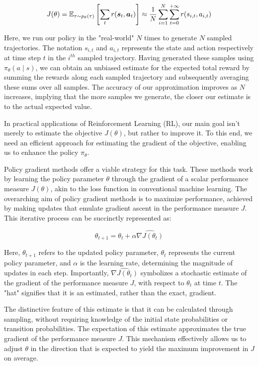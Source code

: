 \begin{align}
    J(\theta) = \mathbb E_{\tau \sim p_{\theta}(\tau)} \left[ \sum_{t} r(\boldsymbol{s}_t, \boldsymbol{a}_t) \right] \approx \frac{1}{N} \sum_{i = 1}^{N} \sum_{t=0}^{+ \infty} r(s_{i,t}, a_{i,t})
\end{align}

Here, we run our policy in the "real-world" $N$ times to generate $N$ sampled trajectories. The notation $s_{i,t}$ and $a_{i,t}$ represents the state and action respectively at time step $t$ in the $i^{th}$ sampled trajectory. Having generated these samples using $\pi_{\theta}(a \mid s)$, we can obtain an unbiased estimate for the expected total reward by summing the rewards along each sampled trajectory and subsequently averaging these sums over all samples. The accuracy of our approximation improves as $N$ increases, implying that the more samples we generate, the closer our estimate is to the actual expected value.

In practical applications of Reinforcement Learning (RL), our main goal isn't merely to estimate the objective $J(\theta)$, but rather to improve it. To this end, we need an efficient approach for estimating the gradient of the objective, enabling us to enhance the policy $\pi_{\theta}$.

Policy gradient methods offer a viable strategy for this task. These methods work by learning the policy parameter $\theta$ through the gradient of a scalar performance measure $J(\theta)$, akin to the loss function in conventional machine learning. The overarching aim of policy gradient methods is to maximize performance, achieved by making updates that emulate gradient ascent in the performance measure $J$. This iterative process can be succinctly represented as:

\begin{equation}
\theta_{t+1} = \theta_t + \alpha \widehat{\nabla J(\theta_t)}
\end{equation}

Here, $\theta_{t+1}$ refers to the updated policy parameter, $\theta_t$ represents the current policy parameter, and $\alpha$ is the learning rate, determining the magnitude of updates in each step. Importantly, $\widehat{\nabla J(\theta_t)}$ symbolizes a stochastic estimate of the gradient of the performance measure $J$, with respect to $\theta_t$ at time $t$. The "hat" signifies that it is an estimated, rather than the exact, gradient.

The distinctive feature of this estimate is that it can be calculated through sampling, without requiring knowledge of the initial state probabilities or transition probabilities. The expectation of this estimate approximates the true gradient of the performance measure $J$. This mechanism effectively allows us to adjust $\theta$ in the direction that is expected to yield the maximum improvement in $J$ on average.

